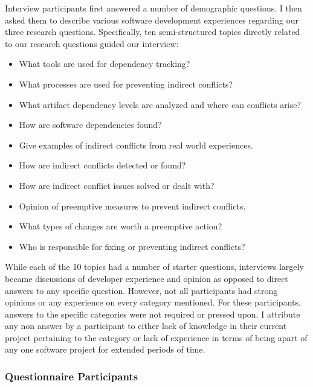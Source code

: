 Interview participants first answered a number of demographic questions. I then asked them to describe various software development experiences regarding our three research questions.
Specifically, ten semi-structured  topics directly related to our research questions guided our interview: 


\begin{itemize}
\item What tools are used for dependency tracking?
\item What processes are used for preventing indirect conflicts?
\item What artifact dependency levels are analyzed and where can conflicts arise?
\item How are software dependencies found?
\item Give examples of indirect conflicts from real world experiences.
\item How are indirect conflicts detected or found?
\item How are indirect conflict issues solved or dealt with?
\item Opinion of preemptive measures to prevent indirect conflicts.
\item What types of changes are worth a preemptive action?
\item Who is responsible for fixing or preventing indirect conflicts?
\end{itemize}

While each of the 10 topics had a number of starter questions, interviews 
largely became discussions of developer experience and opinion as opposed to direct answers to any specific question.
However, not all participants had strong opinions or any experience on every category mentioned. For these participants, answers 
to the specific categories were not required or pressed upon. I attribute any non answer by a participant to
either lack of knowledge in their current project pertaining to the category or lack of experience in terms of
being apart of any one software project for extended periods of time. 

\subsubsection{Questionnaire Participants}

